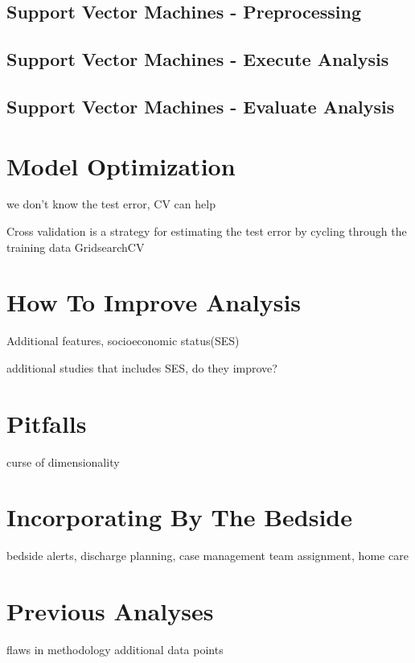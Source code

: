 \documentclass[sigconf]{acmart}
\begin{document}
\subsection{Support Vector Machines - Preprocessing}

\subsection{Support Vector Machines - Execute Analysis}

\subsection{Support Vector Machines - Evaluate Analysis}



\section{Model Optimization}

we don't know the test error, CV can help

Cross validation is a strategy for estimating the test error by cycling through the training data \cite{cite03}
GridsearchCV

\section{How To Improve Analysis}

Additional features, socioeconomic status(SES)

additional studies that includes SES, do they improve?

\section{Pitfalls}

curse of dimensionality

\section{Incorporating By The Bedside}
bedside alerts, discharge planning, case management team assignment, home care

\section{Previous Analyses}

flaws in methodology
additional data points
\end{document}
